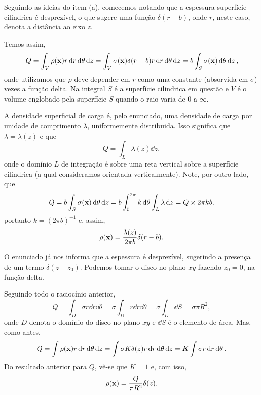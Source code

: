 Seguindo as ideias do item (a), comecemos notando que a espessura superfície cilindrica é desprezível, o que sugere uma função $\delta(r - b)$, onde $r$, neste caso, denota a distância ao eixo $z$.

Temos assim,
\[
  Q = \int_V \rho(\vb{x}) r \dd{r} \dd{\theta} \dd{z} = \int_V \sigma(\vb{x}) \delta(r - b) r \dd{r} \dd{\theta} \dd{z} = b \int_S \sigma(\vb{x}) \dd{\theta} \dd{z},
\]
onde utilizamos que $\rho$ deve depender em $r$ como uma constante (absorvida em $\sigma$) vezes a função delta. Na integral $S$ é a superfície cilindrica em questão e $V$ é o volume englobado pela superfície $S$ quando o raio varia de $0$ a $\infty$.

A densidade superficial de carga é, pelo enunciado, uma densidade de carga por unidade de comprimento $\lambda$, uniformemente distribuida. Isso significa que $\lambda = \lambda(z)$ e que
\[
  Q = \int_L \lambda(z) \dd{z},
\]
onde o domínio $L$ de integração é sobre uma reta vertical sobre a superfície cilindrica (a qual consideramos orientada verticalmente). Note, por outro lado, que
\[
  Q = b\int_S \sigma(\vb{x}) \dd{\theta} \dd{z} = b\int_0^{2\pi} k \dd{\theta} \int_L \lambda \dd{z} = Q \times 2\pi k b,
\]
portanto $k = (2\pi b)^{-1}$ e, assim,
\begin{equation*}
  \rho(\vb{x}) = \frac{\lambda(z)}{2\pi b} \delta(r - b).
\end{equation*}



O enunciado já nos informa que a espessura é desprezível, sugerindo a presença de um termo $\delta(z - z_0)$. Podemos tomar o disco no plano $xy$ fazendo $z_0 = 0$, na função delta.

Seguindo todo o raciocínio anterior,
\begin{equation*}
  Q = \int_D \sigma r \dd{r} \dd{\theta} = \sigma \int_D r \dd{r} \dd{\theta} = \sigma \int_D \dd{S} = \sigma \pi R^2,
\end{equation*}
onde $D$ denota o domínio do disco no plano $xy$ e $\dd{S}$ é o elemento de área. Mas, como antes,
\[
  Q = \int \rho(\vb{x}) r\dd{r}\dd{\theta} \dd{z} = \int \sigma K \delta(z) r\dd{r}\dd{\theta} \dd{z} = K \int \sigma r\dd{r}\dd{\theta}.
\]
Do resultado anterior para $Q$, vê-se que $K = 1$ e, com isso,
\begin{equation*}
  \rho(\vb{x}) = \frac{Q}{\pi R^2} \delta(z).
\end{equation*}



